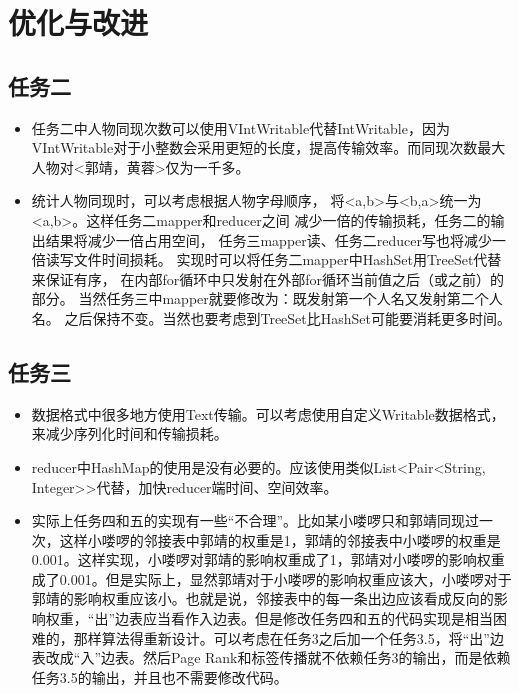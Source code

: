 \documentclass[a4paper,UTF8]{article}
\numberwithin{equation}{section}
\begin{document}
\section{优化与改进}
\subsection{任务二}
\begin{itemize}

    \item 任务二中人物同现次数可以使用VIntWritable代替IntWritable，因为VIntWritable对于小整数会采用更短的长度，提高传输效率。而同现次数最大人物对<郭靖，黄蓉>仅为一千多。
    \item 统计人物同现时，可以考虑根据人物字母顺序，
    将<a,b>与<b,a>统一为<a,b>。这样任务二mapper和reducer之间
    减少一倍的传输损耗，任务二的输出结果将减少一倍占用空间，
    任务三mapper读、任务二reducer写也将减少一倍读写文件时间损耗。
    实现时可以将任务二mapper中HashSet用TreeSet代替来保证有序，
    在内部for循环中只发射在外部for循环当前值之后（或之前）的部分。
    当然任务三中mapper就要修改为：既发射第一个人名又发射第二个人名。
    之后保持不变。当然也要考虑到TreeSet比HashSet可能要消耗更多时间。
\end{itemize}

\subsection{任务三}
\begin{itemize}
	\item 数据格式中很多地方使用Text传输。可以考虑使用自定义Writable数据格式，来减少序列化时间和传输损耗。
	\item reducer中HashMap的使用是没有必要的。应该使用类似List<Pair<String, Integer>>代替，加快reducer端时间、空间效率。
	\item 实际上任务四和五的实现有一些“不合理”。比如某小喽啰只和郭靖同现过一次，这样小喽啰的邻接表中郭靖的权重是1，郭靖的邻接表中小喽啰的权重是0.001。这样实现，小喽啰对郭靖的影响权重成了1，郭靖对小喽啰的影响权重成了0.001。但是实际上，显然郭靖对于小喽啰的影响权重应该大，小喽啰对于郭靖的影响权重应该小。也就是说，邻接表中的每一条出边应该看成反向的影响权重，“出”边表应当看作入边表。但是修改任务四和五的代码实现是相当困难的，那样算法得重新设计。可以考虑在任务3之后加一个任务3.5，将“出”边表改成“入”边表。然后Page Rank和标签传播就不依赖任务3的输出，而是依赖任务3.5的输出，并且也不需要修改代码。
	
\end{itemize}
\end{document}
